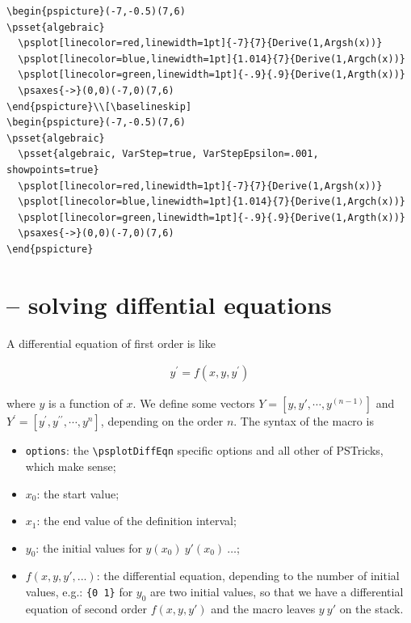 \documentclass[11pt,english,BCOR=10mm,DIV=12,bibliography=totoc,parskip=false,headings=small,
    headinclude=false,footinclude=false,oneside]{pst-doc}
\begin{document}
\begin{lstlisting}
\begin{pspicture}(-7,-0.5)(7,6)
\psset{algebraic}
  \psplot[linecolor=red,linewidth=1pt]{-7}{7}{Derive(1,Argsh(x))}
  \psplot[linecolor=blue,linewidth=1pt]{1.014}{7}{Derive(1,Argch(x))}
  \psplot[linecolor=green,linewidth=1pt]{-.9}{.9}{Derive(1,Argth(x))}
  \psaxes{->}(0,0)(-7,0)(7,6)
\end{pspicture}\\[\baselineskip]
\begin{pspicture}(-7,-0.5)(7,6)
\psset{algebraic}
  \psset{algebraic, VarStep=true, VarStepEpsilon=.001, showpoints=true}
  \psplot[linecolor=red,linewidth=1pt]{-7}{7}{Derive(1,Argsh(x))}
  \psplot[linecolor=blue,linewidth=1pt]{1.014}{7}{Derive(1,Argch(x))}
  \psplot[linecolor=green,linewidth=1pt]{-.9}{.9}{Derive(1,Argth(x))}
  \psaxes{->}(0,0)(-7,0)(7,6)
\end{pspicture}
\end{lstlisting}


\clearpage
\section[\nxLcs{psplotDiffEqn} -- solving diffential equations]%
  { -- solving diffential equations}


 A differential equation of first order is like

\begin{align} y^\prime=f(x,y,y^\prime) \end{align}


where $y$ is a function of $x$. We define some vectors $Y=[y, y',
\cdots , y^{(n-1)}]$ and $Y^\prime=[y^\prime, y^{\prime\prime},
\cdots , y^{n}]$, depending on the order $n$. The syntax of the
macro is

\begin{BDef}
\OptArgs{}
\end{BDef}

\begin{itemize}\setlength\itemsep{0pt}\setlength\parsep{0pt}\setlength\parskip{0pt}
\item \verb+options+: the \verb+\psplotDiffEqn+ specific options and all other of PSTricks, which
make sense;
\item $x_0$: the start value;
\item $x_1$: the end value of the definition interval;
\item $y_0$: the initial values for $y(x_0)\ y'(x_0)\ \ldots$;
\item $f(x,y,y',...)$: the differential equation, depending to the number of initial values, e.g.:
    \verb+{0 1}+ for $y_0$ are two initial values, so that we have a differential equation of
    second order $f(x,y,y')$ and the macro leaves $y\ y'$ on the stack.
\end{itemize}
\end{document}
